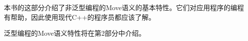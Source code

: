 本书的这部分介绍了非泛型编程的Move语义的基本特性。它们对应用程序的编程有帮助，因此使用现代C++的程序员都应该了解。\par

泛型编程的Move语义特性将在第2部分中介绍。\par

\newpage